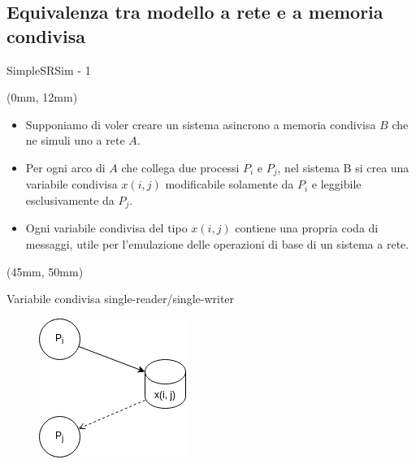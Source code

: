 \documentclass{beamer}
\begin{document}
    \subsection{Equivalenza tra modello a rete e a memoria condivisa}
    \begin{frame}{SimpleSRSim - 1}
        \begin{textblock*}{\textwidth}
            (0mm, 12mm)
            \begin{itemize}
                \item Supponiamo di voler creare un sistema asincrono a memoria condivisa $B$ che ne simuli uno a rete $A$.
                \item Per ogni arco di $A$ che collega due processi $P_i$ e $P_j$, nel sistema B si crea una variabile condivisa $x(i, j)$ modificabile solamente da $P_i$ e leggibile esclusivamente da $P_j$.%
                \item Ogni variabile condivisa del tipo $x(i,j)$ contiene una propria coda di messaggi, utile per l’emulazione delle operazioni di base di un sistema a rete.
            \end{itemize}
        \end{textblock*}
        \begin{textblock*}{0.65\textwidth}
            (45mm, 50mm)
            \begin{block}{Variabile condivisa single-reader/single-writer}
                \begin{figure}
                    \centering
                    \includegraphics[scale=0.4]{struttura_di_base.png}
                \end{figure}
            \end{block}
        \end{textblock*}
    \end{frame}
\end{document}
